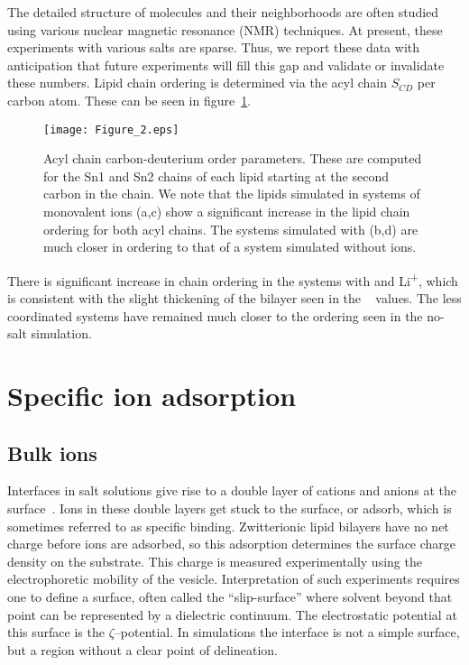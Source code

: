 The detailed structure of molecules and their neighborhoods are often studied using 
various nuclear magnetic resonance (NMR) techniques.
{At present, these experiments with various salts are sparse.}
{Thus,} we report these data with anticipation that future experiments will fill this gap and validate
or invalidate
these numbers.
Lipid chain ordering is determined via the acyl chain $S_{CD}$ per carbon
atom. These can be seen in figure~\ref{figch3:op}. 
\begin{figure}[h!tb]
    \caption[Acyl chain order parameters]{Acyl chain carbon-deuterium order parameters. These are computed for the Sn1 and Sn2 chains of each lipid starting at the 
        second carbon in the chain\cite{egberts:1988,Douliez:1995}. We note that the lipids simulated in systems of monovalent ions (a,c) show a significant increase
in the lipid chain ordering for both acyl chains. The systems simulated with \mg (b,d) are much closer in ordering to that of a system
simulated without ions.}
    \label{figch3:op}
    \texttt{[image: Figure\_2.eps]}
\end{figure}

There is significant increase in chain ordering in the systems 
with \na and Li\textsuperscript{+}, which {is} consistent with the slight thickening
of the bilayer seen in the \db~ values. The less coordinated \mg systems have remained much closer to the 
ordering seen in the no-salt simulation.


\section{Specific ion adsorption}
\subsection{Bulk ions}

Interfaces in salt solutions give rise to a double layer of cations and anions at the surface~\cite{israelachvili:2011:intermol}. 
Ions in these double layers get stuck to the surface, or adsorb, which is sometimes referred to as specific binding. Zwitterionic lipid bilayers have no net charge before ions are adsorbed,
so this adsorption
determines the surface charge density on the substrate. This charge is measured experimentally using the electrophoretic mobility of the vesicle. Interpretation
of such experiments requires one to define a surface, often called the ``slip-surface'' where solvent 
beyond that point
can be represented by a dielectric continuum. The electrostatic potential at this surface is the $\zeta$--potential.
In simulations the interface is not a simple surface, but a region {without a clear point of delineation}. 

